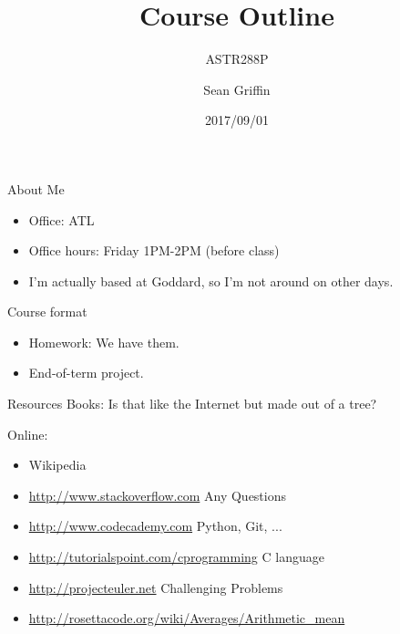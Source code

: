 \documentclass[10pt]{beamer}
\title{Course Outline}
\subtitle{ASTR288P}
\date{2017/09/01}
\author{Sean Griffin}
\institute{UMCP / NASA GSFC}
\begin{document}
\maketitle


\begin{frame}[fragile]{About Me}
	\begin{itemize}
		\item Office: ATL
		\item Office hours: Friday 1PM-2PM (before class)
		\item I'm actually based at Goddard, so I'm not around on other days.
	\end{itemize}
\end{frame}

\begin{frame}[fragile]{Course format}
	\begin{itemize}
		\item Homework: We have them.
		\item End-of-term project. 
	\end{itemize}
\end{frame}

\begin{frame}[fragile]{Resources}
	Books: Is that like the Internet but made out of a tree? 
	
	Online: 
	\begin{itemize}
		\item Wikipedia
		\item \url{http://www.stackoverflow.com} Any Questions
		\item \url{http://www.codecademy.com} Python, Git, ...
		\item \url{http://tutorialspoint.com/cprogramming} C language
		\item \url{http://projecteuler.net} Challenging Problems
   		\item \url{http://rosettacode.org/wiki/Averages/Arithmetic_mean}
	\end{itemize}

\end{frame}
\end{document}
